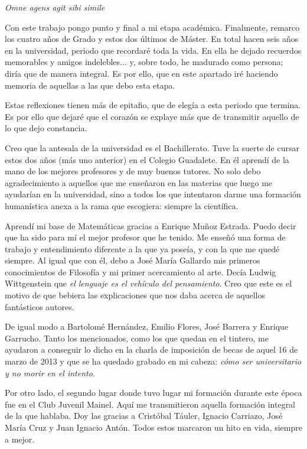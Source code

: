 
\hfill \textit{Omne agens agit sibi simile}
\newline

Con este trabajo pongo punto y final a mi etapa académica. Finalmente, remarco los cuatro años de Grado y estos dos últimos de Máster. En total hacen seis años en la universidad, periodo que recordaré toda la vida. En ella he dejado recuerdos memorables y amigos indelebles... y, sobre todo, he madurado como persona; diría que de manera integral. Es por ello, que en este apartado iré haciendo memoria de aquellas a las que debo esta etapa.

Estas reflexiones tienen más de epitafio, que de elegía a esta periodo que termina. Es por ello que dejaré que el corazón se explaye más que de transmitir aquello de lo que dejo constancia.

Creo que la antesala de la universidad es el Bachillerato. Tuve la suerte de cursar estos dos años (más uno anterior) en el Colegio Guadalete. En él aprendí de la mano de los mejores profesores y de muy buenos tutores. No solo debo agradecimiento a aquellos que me enseñaron en las materias que luego me ayudarían en la universidad, sino a todos los que intentaron darme una formación humanística anexa a la rama que escogiera: siempre la científica.

Aprendí mi base de Matemáticas gracias a Enrique Muñoz Estrada. Puedo decir que ha sido para mí el mejor profesor que he tenido. Me enseñó una forma de trabajo y entendimiento diferente a la que ya poseía, y con la que me quedé siempre. Al igual que con él, debo a José María Gallardo mis primeros conocimientos de Filosofía y mi primer acercamiento al arte. Decía Ludwig Wittgenstein que \textit{el lenguaje es el vehículo del pensamiento}. Creo que este es el motivo de que bebiera las explicaciones que nos daba acerca de aquellos fantásticos autores.

De igual modo a Bartolomé Hernández, Emilio Flores, José Barrera y Enrique Garrucho. Tanto los mencionados, como los que quedan en el tintero, me ayudaron a conseguir lo dicho en la charla de imposición de becas de aquel 16 de marzo de 2013 y que se ha quedado grabado en mi cabeza: \textit{cómo ser universitario y no morir en el intento}.

Por otro lado, el segundo lugar donde tuvo lugar mi formación durante este época fue en el Club Juvenil Mainel. Aquí me transmitieron aquella formación integral de la que hablaba. Doy las gracias a Cristóbal Táuler, Ignacio Carriazo, José María Cruz y Juan Ignacio Antón. Todos estos marcaron un hito en vida, siempre a mejor.

